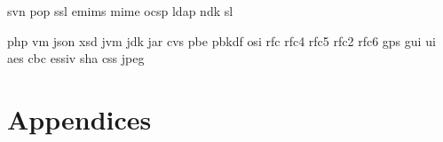 \documentclass[12pt]{report}
\begin{document}
\gls{svn}
\gls{pop}
\gls{ssl}
\gls{emims}
\gls{mime}
\gls{ocsp}
\gls{ldap}
\gls{ndk}
\gls{sl}

\gls{php}
\gls{vm}
\gls{json}
\gls{xsd}
\gls{jvm}
\gls{jdk}
\gls{jar}
\gls{cvs}
\gls{pbe}
\gls{pbkdf}
\gls{osi}
\gls{rfc}
\gls{rfc4}
\gls{rfc5}
\gls{rfc2}
\gls{rfc6}
\gls{gps}
\gls{gui}
\gls{ui}
\gls{aes}
\gls{cbc}
\gls{essiv}
\gls{sha}
\gls{css}
\gls{jpeg}


\part{Appendices}

	\appendix

	
	

	

	

	

	

	

	

	

	

	
\end{document}
